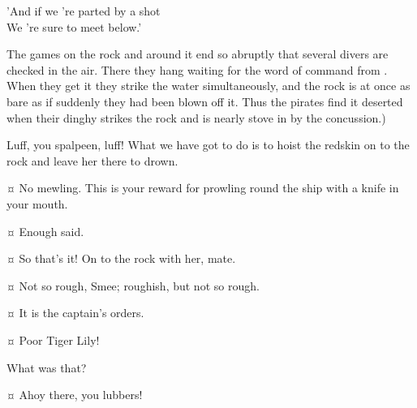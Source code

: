 \begin{drama}
\begin{stagedir}
\begin{drama}
\speakercontinues
	'And if we 're parted by a shot\\
	We 're sure to meet below.'
\end{drama}

The games on the rock and around it end so abruptly that several divers are checked in the air.
There they hang waiting for the word of command from \peter.
When they get it they strike the water simultaneously, and the rock is at once as bare as if suddenly they had been blown off it.
Thus the pirates find it deserted when their dinghy strikes the rock and is nearly stove in by the concussion.)
\end{stagedir}

\smeespeaks
Luff, you spalpeen, luff!
What we have got to do is to hoist the redskin on to the rock and leave her there to drown.


\starkeyspeaks {}¤
No mewling.
This is your reward for prowling round the ship with a knife in your mouth.

\tigerlilyspeaks {}¤
Enough said.

\smeespeaks {}¤
So that's it!
On to the rock with her, mate.

\starkeyspeaks {}¤
Not so rough, Smee; roughish, but not so rough.

\smeespeaks {}¤
It is the captain's orders.


\wendyspeaks {}¤
Poor Tiger Lily!

\starkeyspeaks
What was that?

\peterspeaks {}¤
Ahoy there, you lubbers!


\end{drama}
